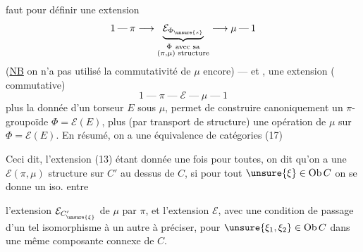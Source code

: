 faut pour définir une extension
\[
1\mathbin{\text{---}}\pi\longrightarrow
\underbrace{\mathcal E_{\Phi_{\unsure{s}}}}_{\substack{\Phi\ \text{avec sa}\\(\pi,\mu)\text{ structure}}}
\longrightarrow\mu\mathbin{\text{---}}1
\]
(\uline{NB} on n'a pas utilisé la commutativité de $\mu$
encore) --- et , une  extension
( commutative)
\[
1\mathbin{\text{---}}\pi\mathbin{\text{---}}\mathcal E\mathbin{\text{---}}\mu\mathbin{\text{---}}1
\]
plus la donnée d'un torseur $E$ sous $\mu$,
permet de construire canoniquement un
$\pi$-groupoïde $\Phi=\mathcal E(E)$, plus (par transport
de structure) une opération de $\mu$ sur
$\Phi=\mathcal E(E)$. En résumé, on a 
une équivalence de catégories
\quad(17)

Ceci dit, l'extension (13) étant donnée
une fois pour toutes, on dit qu'on a
une $\mathcal E(\pi,\mu)$ structure sur $C'$ au dessus de
$C$, si 
pour tout $\unsure{\xi}\in\operatorname{Ob}C$ on se donne un iso. entre

l'extension $\mathcal E_{C'_{\unsure{\xi}}}$ de $\mu$ par $\pi$, et l'extension
$\mathcal E$, avec une condition de passage d'un
tel isomorphisme à un autre à préciser,
pour $\unsure{\xi_1,\xi_2}\in\operatorname{Ob}C$ dans une même composante
connexe de $C$.


